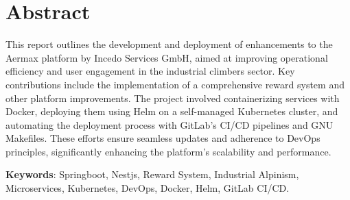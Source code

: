 \section*{Abstract}

This report outlines the development and deployment of enhancements to the Aermax platform by Incedo Services GmbH, aimed at improving operational efficiency and user engagement in the industrial climbers sector. Key contributions include the implementation of a comprehensive reward system and other platform improvements. The project involved containerizing services with Docker, deploying them using Helm on a self-managed Kubernetes cluster, and automating the deployment process with GitLab's CI/CD pipelines and GNU Makefiles. These efforts ensure seamless updates and adherence to DevOps principles, significantly enhancing the platform's scalability and performance.

\vspace{2cm}
\noindent\textbf{Keywords}: Springboot, Nestjs, Reward System, Industrial Alpinism, Microservices, Kubernetes, DevOps, Docker, Helm, GitLab CI/CD.
\newpage